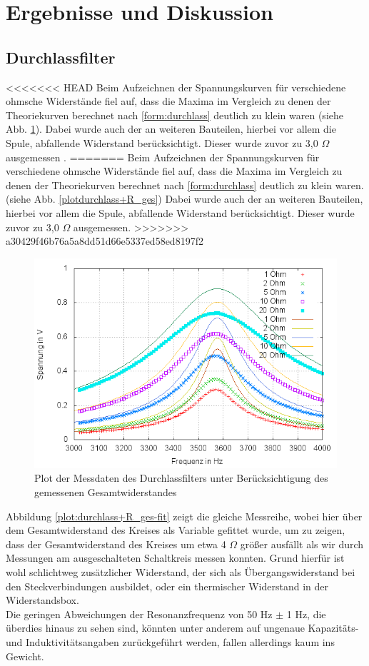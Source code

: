 \section{Ergebnisse und Diskussion}

\subsection{Durchlassfilter}
<<<<<<< HEAD
Beim Aufzeichnen der Spannungskurven für verschiedene ohmsche Widerstände fiel auf, dass die Maxima im Vergleich zu denen der Theoriekurven berechnet nach \eqref{form:durchlass} deutlich zu klein waren (siehe Abb. \ref{plot:durchlass+R_ges}). Dabei wurde auch der an weiteren Bauteilen, hierbei vor allem die Spule, abfallende Widerstand berücksichtigt. Dieser wurde zuvor zu 3,0 $  \Omega $ ausgemessen .
=======
Beim Aufzeichnen der Spannungskurven für verschiedene ohmsche Widerstände fiel auf, dass die Maxima im Vergleich zu denen der Theoriekurven berechnet nach \eqref{form:durchlass} deutlich zu klein waren. (siehe Abb. \ref{plotdurchlass+R_ges}) Dabei wurde auch der an weiteren Bauteilen, hierbei vor allem die Spule, abfallende Widerstand berücksichtigt. Dieser wurde zuvor zu 3,0 $  \Omega $ ausgemessen.
>>>>>>> a30429f46b76a5a8dd51d66e5337ed58ed8197f2
\begin{figure}[h]
        \includegraphics[width=.9\textwidth]{images/plot/durchlassfilter+theorie+R_ges.png}
\caption{Plot der Messdaten des Durchlassfilters unter Berücksichtigung des gemessenen Gesamtwiderstandes}
\label{plot:durchlass+R_ges}
\end{figure}
Abbildung \ref{plot:durchlass+R_ges-fit} zeigt die gleiche Messreihe, wobei hier über dem Gesamtwiderstand des Kreises als Variable gefittet wurde, um zu zeigen, dass der Gesamtwiderstand des Kreises um etwa 4 $\Omega$ größer ausfällt als wir durch Messungen am ausgeschalteten Schaltkreis messen konnten. Grund hierfür ist wohl schlichtweg zusätzlicher Widerstand, der sich als Übergangswiderstand bei den Steckverbindungen ausbildet, oder ein thermischer Widerstand in der Widerstandsbox.\\
Die geringen Abweichungen der Resonanzfrequenz von 50 Hz $\pm$ 1 Hz, die überdies hinaus zu sehen sind, könnten unter anderem auf ungenaue Kapazitäts- und Induktivitätsangaben zurückgeführt werden, fallen allerdings kaum ins Gewicht.

